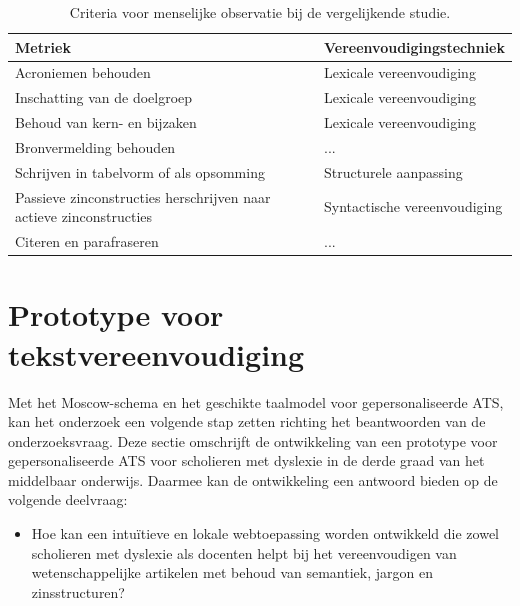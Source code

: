 \begin{table}
	\begin{tabular}{| m{6cm} | m{6cm} |}
		\hline
		\textbf{Metriek} & \textbf{Vereenvoudigingstechniek} \\ \hline
		Acroniemen behouden & Lexicale vereenvoudiging 	\\ \hline
		Inschatting van de doelgroep & Lexicale vereenvoudiging	\\ \hline
		Behoud van kern- en bijzaken & Lexicale vereenvoudiging \\ \hline
		Bronvermelding behouden &  ... \\ \hline
		Schrijven in tabelvorm of als opsomming & Structurele aanpassing \\ \hline
		Passieve zinconstructies herschrijven naar actieve zinconstructies & Syntactische vereenvoudiging \\ \hline
		Citeren en parafraseren & ... \\ \hline
	\end{tabular}
	\caption{Criteria voor menselijke observatie bij de vergelijkende studie.}
	\label{table:criteria-vergelijkende-studie-human-obv}
\end{table}

\section{Prototype voor tekstvereenvoudiging}

Met het Moscow-schema en het geschikte taalmodel voor gepersonaliseerde ATS, kan het onderzoek een volgende stap zetten richting het beantwoorden van de onderzoeksvraag. Deze sectie omschrijft de ontwikkeling van een prototype voor gepersonaliseerde ATS voor scholieren met dyslexie in de derde graad van het middelbaar onderwijs. Daarmee kan de ontwikkeling een antwoord bieden op de volgende deelvraag: 

\begin{itemize}
	\item Hoe kan een intuïtieve en lokale webtoepassing worden ontwikkeld die zowel scholieren met dyslexie als docenten helpt bij het vereenvoudigen van wetenschappelijke artikelen met behoud van semantiek, jargon en zinsstructuren?
\end{itemize}

